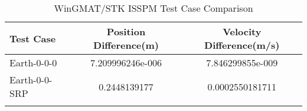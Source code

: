 \begin{table}[htbp!]
\centering
\caption{ WinGMAT/STK ISSPM Test Case Comparison}
      \begin{tabular}{lcc}
      \hline\hline
          Test Case & Position Difference(m) & Velocity Difference(m/s) \\
         \hline
         Earth-0-0-0 & 7.209996246e-006 & 7.846299855e-009 \\
         Earth-0-0-SRP & 0.2448139177 & 0.0002550181711 \\
      \hline\hline
      \label{Table: ISSPM WinGMAT-STK Table} 
\end{tabular}
\end{table}
